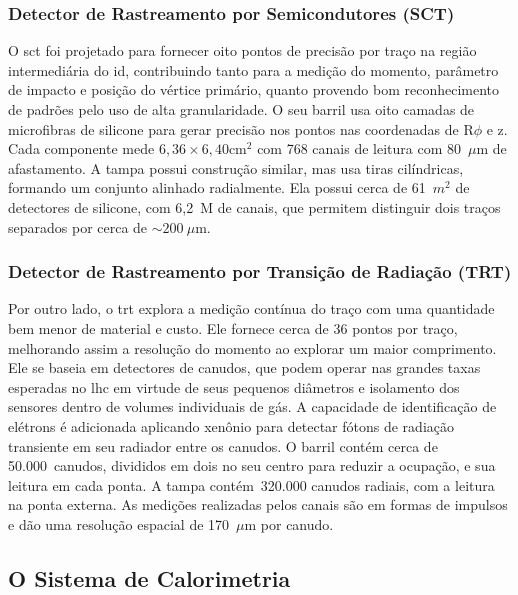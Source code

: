 \subsubsection{Detector de Rastreamento por Semicondutores (SCT)}
\label{sssec:sct}

O \gls{sct} foi projetado para fornecer oito pontos de precisão por traço na
região intermediária do \gls{id}, contribuindo tanto para a medição do momento,
parâmetro de impacto e posição do vértice primário, quanto provendo bom
reconhecimento de padrões pelo uso de alta granularidade. O seu barril usa oito
camadas de microfibras de silicone para gerar precisão nos pontos nas
coordenadas de R$\phi$ e z. Cada componente mede $6,36\times6,40 \text{cm}^2$ com 768 canais de
leitura com 80~$\mu$m de afastamento. A tampa possui construção similar, mas usa
tiras cilíndricas, formando um conjunto alinhado radialmente. Ela possui cerca de 61~$m^2$ 
de detectores de silicone, com 6,2~M de canais, que permitem distinguir
dois traços separados por cerca de $\sim200~\mu$m.

\subsubsection{Detector de Rastreamento por Transição de Radiação (TRT)}
\label{sssec:trt}

Por outro lado, o \gls{trt} explora a medição contínua do traço com uma
quantidade bem menor de material e custo. Ele fornece cerca de 36 pontos por
traço, melhorando assim a resolução do momento ao explorar um maior
\gls{comprimento}. Ele se baseia em detectores de canudos, que podem operar nas
grandes taxas esperadas no \gls{lhc} em virtude de seus pequenos diâmetros e
isolamento dos sensores dentro de volumes individuais de gás. A capacidade de
identificação de elétrons é adicionada aplicando xenônio para detectar fótons de
radiação transiente em seu radiador entre os canudos. O barril contém cerca de
50.000~canudos, divididos em dois no seu centro para reduzir a ocupação, e sua
leitura em cada ponta. A tampa contém~320.000 canudos radiais, com a leitura na
ponta externa. As medições realizadas pelos canais são em formas de
impulsos e dão uma resolução espacial de 170~$\mu$m por canudo.


\newpage
\subsection{O Sistema de Calorimetria}
\label{ssec:calorimetria}

